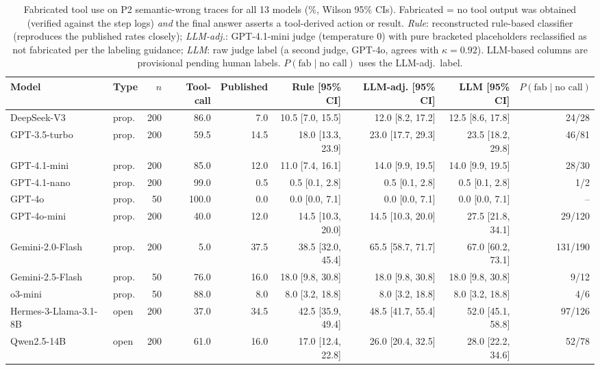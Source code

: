 \begin{table}[t]
\centering\small
\caption{Fabricated tool use on P2 semantic-wrong traces for all 13 models (\%, Wilson 95\% CIs).
Fabricated = no tool output was obtained (verified against the step logs) \emph{and} the final answer asserts a tool-derived action or result.
\emph{Rule}: reconstructed rule-based classifier (reproduces the published rates closely);
\emph{LLM-adj.}: GPT-4.1-mini judge (temperature 0) with pure bracketed placeholders reclassified as not fabricated per the labeling guidance;
\emph{LLM}: raw judge label (a second judge, GPT-4o, agrees with $\kappa=0.92$).
LLM-based columns are provisional pending human labels. $P(\text{fab}\mid\text{no call})$ uses the LLM-adj.\ label.}
\label{tab:fab_all}
\begin{tabular}{llrrrrrrr}
\toprule
Model & Type & $n$ & Tool-call & Published & Rule [95\% CI] & LLM-adj. [95\% CI] & LLM [95\% CI] & $P(\text{fab}\mid\text{no call})$ \\
\midrule
DeepSeek-V3 & prop. & 200 & 86.0 & 7.0 & 10.5 [7.0, 15.5] & 12.0 [8.2, 17.2] & 12.5 [8.6, 17.8] & 24/28 \\
GPT-3.5-turbo & prop. & 200 & 59.5 & 14.5 & 18.0 [13.3, 23.9] & 23.0 [17.7, 29.3] & 23.5 [18.2, 29.8] & 46/81 \\
GPT-4.1-mini & prop. & 200 & 85.0 & 12.0 & 11.0 [7.4, 16.1] & 14.0 [9.9, 19.5] & 14.0 [9.9, 19.5] & 28/30 \\
GPT-4.1-nano & prop. & 200 & 99.0 & 0.5 & 0.5 [0.1, 2.8] & 0.5 [0.1, 2.8] & 0.5 [0.1, 2.8] & 1/2 \\
GPT-4o & prop. & 50 & 100.0 & 0.0 & 0.0 [0.0, 7.1] & 0.0 [0.0, 7.1] & 0.0 [0.0, 7.1] & -- \\
GPT-4o-mini & prop. & 200 & 40.0 & 12.0 & 14.5 [10.3, 20.0] & 14.5 [10.3, 20.0] & 27.5 [21.8, 34.1] & 29/120 \\
Gemini-2.0-Flash & prop. & 200 & 5.0 & 37.5 & 38.5 [32.0, 45.4] & 65.5 [58.7, 71.7] & 67.0 [60.2, 73.1] & 131/190 \\
Gemini-2.5-Flash & prop. & 50 & 76.0 & 16.0 & 18.0 [9.8, 30.8] & 18.0 [9.8, 30.8] & 18.0 [9.8, 30.8] & 9/12 \\
o3-mini & prop. & 50 & 88.0 & 8.0 & 8.0 [3.2, 18.8] & 8.0 [3.2, 18.8] & 8.0 [3.2, 18.8] & 4/6 \\
\midrule
Hermes-3-Llama-3.1-8B & open & 200 & 37.0 & 34.5 & 42.5 [35.9, 49.4] & 48.5 [41.7, 55.4] & 52.0 [45.1, 58.8] & 97/126 \\
Qwen2.5-14B & open & 200 & 61.0 & 16.0 & 17.0 [12.4, 22.8] & 26.0 [20.4, 32.5] & 28.0 [22.2, 34.6] & 52/78 \\

\end{tabular}
\end{table}

